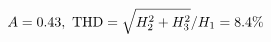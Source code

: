 \documentclass[preview]{standalone}
\begin{document}
\begin{align*}
\special{dvisvgm:raw <g id='unique000'>}A=0.43,\ \text{THD}=\sqrt{H_2^2+H_3^2}/H_1=8.4\%\special{dvisvgm:raw </g>}
\end{align*}
\end{document}
